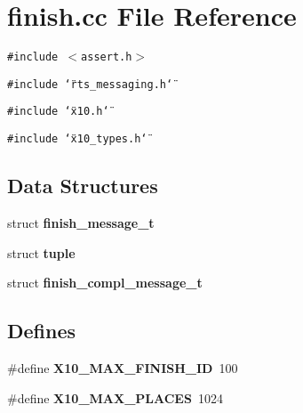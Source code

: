 \section{finish.cc File Reference}
\label{finish_8cc}
{\tt \#include $<$assert.h$>$}\par
{\tt \#include \char`\"{}rts\_\-messaging.h\char`\"{}}\par
{\tt \#include \char`\"{}x10.h\char`\"{}}\par
{\tt \#include \char`\"{}x10\_\-types.h\char`\"{}}\par
\subsection*{Data Structures}
\begin{CompactItemize}
\item 
struct {\bf finish\_\-message\_\-t}
\item 
struct {\bf tuple}
\item 
struct {\bf finish\_\-compl\_\-message\_\-t}
\end{CompactItemize}
\subsection*{Defines}
\begin{CompactItemize}
\item 
\#define {\bf X10\_\-MAX\_\-FINISH\_\-ID}\ 100
\item 
\#define {\bf X10\_\-MAX\_\-PLACES}\ 1024
\end{CompactItemize}
